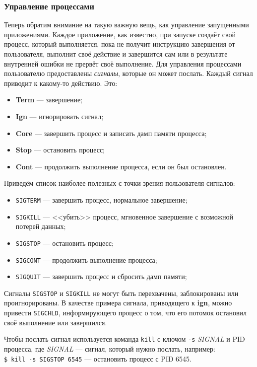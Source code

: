 \subsubsection{Управление процессами}\label{base:os:structure:userutils:processes}
Теперь обратим внимание на такую важную вещь, как управление запущенными приложениями. Каждое приложение, как известно, при запуске создаёт свой процесс, который выполняется, пока не получит инструкцию завершения от пользователя, выполнит своё действие и завершится сам или в результате внутренней ошибки не прервёт своё выполнение.
Для управления процессами пользователю предоставлены \emph{сигналы}, которые он может послать. Каждый сигнал приводит к какому-то действию. Это:
\begin{itemize}
 \item \textbf{Term} --- завершение;
 \item \textbf{Ign} --- игнорировать сигнал;
 \item \textbf{Core} --- завершить процесс и записать дамп памяти процесса;
 \item \textbf{Stop} --- остановить процесс;
 \item \textbf{Cont} --- продолжить выполнение процесса, если он был остановлен.
\end{itemize}
Приведём список наиболее полезных с точки зрения пользователя сигналов:
\begin{itemize}
 \item \texttt{SIGTERM} --- завершить процесс, нормальное завершение;
 \item \texttt{SIGKILL} --- <<убить>> процесс, мгновенное завершение с возможной потерей данных;
 \item \texttt{SIGSTOP} --- остановить процесс;
 \item \texttt{SIGCONT} --- продолжить выполнение процесса;
 \item \texttt{SIGQUIT} --- завершить процесс и сбросить дамп памяти;
\end{itemize}
Сигналы \texttt{SIGSTOP} и \texttt{SIGKILL} не могут быть перехвачены, заблокированы или проигнорированы. В качестве примера сигнала, приводящего к \textbf{ign}, можно привести \texttt{SIGCHLD}, информирующего процесс о том, что его потомок остановил своё выполнение или завершился.

Чтобы послать сигнал используется команда \texttt{kill} с ключом \texttt{-s} \emph{SIG\-NAL} и PID процесса, где \emph{SIGNAL} --- сигнал, который нужно послать, например:\\
\texttt{\$ kill -s SIGSTOP 6545} --- остановить процесс с PID 6545.

